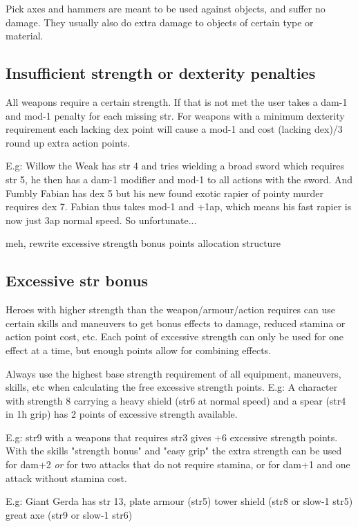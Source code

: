 Pick axes and hammers are meant to be used against objects, and suffer no damage. They usually also do extra damage to objects of certain type or material.


\subsection*{Insufficient strength or dexterity penalties}
All weapons require a certain strength. If that is not met the user takes a dam-1 and mod-1 penalty for each missing str. For weapons with a minimum dexterity requirement each lacking dex point will cause a mod-1 and cost (lacking dex)/3 round up extra action points.

E.g: Willow the Weak has str 4 and tries wielding a broad sword which requires str 5, he then has a dam-1 modifier and mod-1 to all actions with the sword.
And Fumbly Fabian has dex 5 but his new found exotic rapier of pointy murder requires dex 7. Fabian thus takes mod-1 and +1ap, which means his fast rapier is now just 3ap normal speed. So unfortunate...


\vspace{10mm}
\TODO meh, rewrite excessive strength bonus points allocation structure
\subsection*{Excessive str bonus}
Heroes with higher strength than the weapon/armour/action requires can use certain skills and maneuvers to get bonus effects to damage, reduced stamina or action point cost, etc. Each point of excessive strength can only be used for one effect at a time, but enough points allow for combining effects.

Always use the highest base strength requirement of all equipment, maneuvers, skills, etc when calculating the free excessive strength points.
E.g: A character with strength 8 carrying a heavy shield (str6 at normal speed) and a spear (str4 in 1h grip) has 2 points of excessive strength available.

E.g: str9 with a weapons that requires str3 gives +6 excessive strength points. With the skills "strength bonus" and "easy grip" the extra strength can be used for dam+2 \emph{or} for two attacks that do not require stamina, or for dam+1 and one attack without stamina cost.

E.g: Giant Gerda has str 13, 
plate armour (str5)
tower shield (str8 or slow-1 str5)
great axe (str9 or slow-1 str6)



